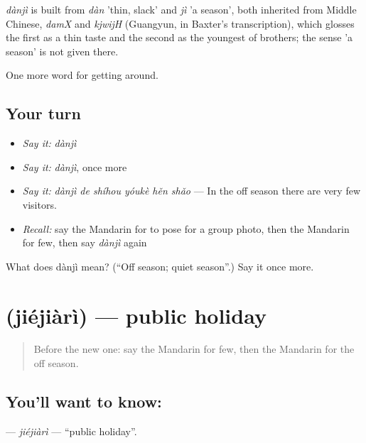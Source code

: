 \begin{cousinweb}
\emph{dànjì} is built from \emph{dàn} 'thin, slack' and \emph{jì} 'a season', both inherited from Middle Chinese, \emph{damX} and \emph{kjwijH} (Guangyun, in Baxter's transcription), which glosses the first as a thin taste and the second as the youngest of brothers; the sense 'a season' is not given there.
\end{cousinweb}

\begin{grammarlens}[title={What you've built}]
One more word for getting around.
\end{grammarlens}

\subsection*{Your turn}
\begin{itemize}
\raggedright
  \item \emph{Say it:} \emph{dànjì}
  \item \emph{Say it:} \emph{dànjì}, once more
  \item \emph{Say it:} \emph{dànjì de shíhou yóukè hěn shǎo} — In the off season there are very few visitors.
  \item \emph{Recall:} say the Mandarin for to pose for a group photo, then the Mandarin for few, then say \emph{dànjì} again
\end{itemize}

\begin{tcolorbox}[breakable,colback=teal!4,colframe=teal!35!black,title={Before you move on}]
What does dànjì mean? (\textquotedblleft{}Off season; quiet season\textquotedblright{}.) Say it once more.
\end{tcolorbox}
\section[\texorpdfstring{\zh{节假日} (jiéjiàrì)}{节假日 (jiéjiàrì)}]{ (jiéjiàrì) — public holiday}

\label{lesson:ZH-C432-jiejiari}



\begin{quote}
Before the new one: say the Mandarin for few, then the Mandarin for the off season.
\end{quote}

\subsection*{You'll want to know: }
\textbf{} — \emph{jiéjiàrì} — \textquotedblleft{}public holiday\textquotedblright{}.

